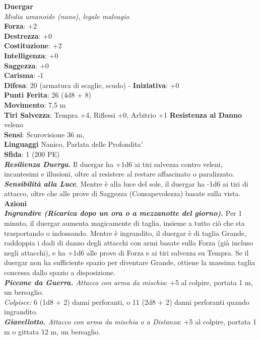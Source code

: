 \begin{multicols}{2}
\medskip\textbf{Duergar}\\
\emph{Media umanoide (nano), legale malvagio}\\
\textbf{Forza}: +2\\
\textbf{Destrezza}: +0\\
\textbf{Costituzione}: +2\\
\textbf{Intelligenza}: +0\\
\textbf{Saggezza}: +0\\
\textbf{Carisma}: -1\\
\textbf{Difesa}: 20 (armatura di scaglie, scudo) - \textbf{Iniziativa}: +0\\
\textbf{Punti Ferita}: 26 (4d8 + 8)\\
\textbf{Movimento}: 7,5 m\\
\textbf{Tiri Salvezza}: Tempra +4, Riflessi +0, Arbitrio +1
\textbf{Resistenza al Danno} veleno\\
\textbf{Sensi}: Scurovisione 36 m, \\
\textbf{Linguaggi} Nanico, Parlata delle Profondita'\\
\textbf{Sfida}: 1 (200 PE)\smallskip\\
\emph{\textbf{Resilienza Duerga.}} Il duergar ha +1d6 ai tiri salvezza contro veleni, incantesimi e illusioni, oltre al resistere al restare affascinato o paralizzato.\\
\emph{\textbf{Sensibilità alla Luce}}. Mentre è alla luce del sole, il duergar ha -1d6 ai tiri di attacco, oltre che alle prove di Saggezza (Consapevolezza) basate sulla vista.\\
\smallskip\textbf{Azioni}\\
\emph{\textbf{Ingrandire (Ricarica dopo un ora o a mezzanotte del giorno).}} Per 1 minuto, il duergar aumenta magicamente di taglia, insieme a tutto ciò che sta trasportando o indossando. Mentre è ingrandito, il duergar è di taglia Grande, raddoppia i dadi di danno degli attacchi con armi basate sulla Forza (già incluso negli attacchi), e ha +1d6 alle prove di Forza e ai tiri salvezza su Tempra. Se il duergar non ha sufficiente spazio per diventare Grande, ottiene la massima taglia concessa dallo spazio a disposizione.\\
\emph{\textbf{Piccone da Guerra.} Attacco con arma da mischia}: +5 al colpire, portata 1 m, un bersaglio.\\
\emph{Colpisce:} 6 (1d8 + 2) danni perforanti, o 11 (2d8 + 2) danni perforanti quando ingrandito.\\
\emph{\textbf{Giavellotto.} Attacco con arma da mischia o a Distanza}: +5 al colpire, portata 1 m o gittata 12 m, un bersaglio.\\

\end{multicols}
